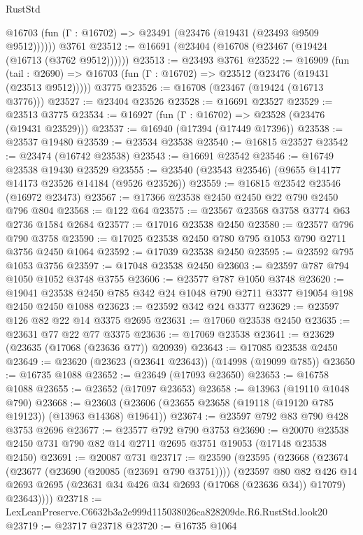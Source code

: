 \begin{lexlean}{RustStd}
\begin{coremodule}
      @16703 (fun (Γ : @16702) => @23491 (@23476 (@19431 (@23493 @9509 @9512))))))
    @3761
@23512 := @16691 (@23404 (@16708 (@23467 (@19424 (@16713 (@3762 @9512))))))
@23513 := @23493 @3761
@23522 := @16909
    (fun (tail : @2690) => @16703 (fun (Γ : @16702) => @23512 (@23476 (@19431 (@23513 @9512)))))
    @3775
@23526 := @16708 (@23467 (@19424 (@16713 @3776)))
@23527 := @23404 @23526
@23528 := @16691 @23527
@23529 := @23513 @3775
@23534 := @16927 (fun (Γ : @16702) => @23528 (@23476 (@19431 @23529)))
@23537 := @16940 (@17394 (@17449 @17396))
@23538 := @23537 @19480
@23539 := @23534 @23538
@23540 := @16815 @23527
@23542 := @23474 (@16742 @23538)
@23543 := @16691 @23542
@23546 := @16749 @23538 @19430 @23529
@23555 := @23540 (@23543 @23546) (@9655 @14177 @14173 @23526 @14184 (@9526 @23526))
@23559 := @16815 @23542 @23546 (@16972 @23473)
@23567 := @17366 @23538 @2450 @2450 @22 @790 @2450 @796 @804
@23568 := @122 @64
@23575 := @23567 @23568 @3758 @3774 @63 @2736 @1584 @2684
@23577 := @17016 @23538 @2450
@23580 := @23577 @796 @790 @3758
@23590 := @17025 @23538 @2450 @780 @795 @1053 @790 @2711 @3756 @2450 @1064
@23592 := @17039 @23538 @2450
@23595 := @23592 @795 @1053 @3756
@23597 := @17048 @23538 @2450
@23603 := @23597 @787 @794 @1050 @1052 @3748 @3755
@23606 := @23577 @787 @1050 @3748
@23620 := @19041 @23538 @2450 @785 @342 @24 @1048 @790 @2711 @3377 @19054 @198 @2450 @2450 @1088
@23623 := @23592 @342 @24 @3377
@23629 := @23597 @126 @82 @22 @14 @3375 @2695
@23631 := @17060 @23538 @2450
@23635 := @23631 @77 @22 @77 @3375
@23636 := @17069 @23538
@23641 := @23629 (@23635 (@17068 (@23636 @77)) @20939)
@23643 := @17085 @23538 @2450
@23649 := @23620 (@23623 (@23641 @23643)) (@14998 (@19099 @785))
@23650 := @16735 @1088
@23652 := @23649 (@17093 @23650)
@23653 := @16758 @1088
@23655 := @23652 (@17097 @23653)
@23658 := @13963 (@19110 @1048 @790)
@23668 := @23603 (@23606 (@23655 @23658 (@19118 (@19120 @785 @19123)) (@13963 @14368) @19641))
@23674 := @23597 @792 @83 @790 @428 @3753 @2696
@23677 := @23577 @792 @790 @3753
@23690 := @20070 @23538 @2450 @731 @790 @82 @14 @2711 @2695 @3751 @19053 (@17148 @23538 @2450)
@23691 := @20087 @731
@23717 := @23590
    (@23595
      (@23668
        (@23674
          (@23677 (@23690 (@20085 (@23691 @790 @3751))))
          (@23597
            @80
            @82
            @426
            @14
            @2693
            @2695
            (@23631 @34 @426 @34 @2693 (@17068 (@23636 @34)) @17079)
            @23643))))
@23718 := LexLeanPreserve.C6632b3a2e999d115038026ca828209de.R6.RustStd.look20
@23719 := @23717 @23718
@23720 := @16735 @1064

\end{coremodule}
\end{lexlean}
